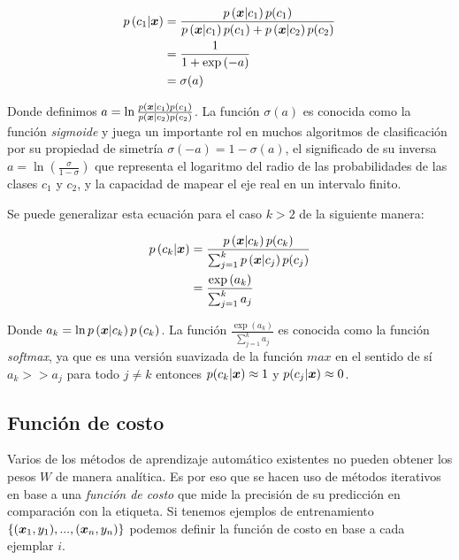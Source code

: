 \begin{align}
    p\left( c_1 | \boldsymbol{x} \right) &= \frac{p\left( \boldsymbol{x} | c_1 \right)p(c_1)}{
                                            p\left( \boldsymbol{x} | c_1 \right) p(c_1) + 
                                            p\left( \boldsymbol{x} | c_2 \right)p(c_2)} \\
                                   &= \frac{1}{1 + \exp\left( -a \right)} \\
                                   &= \sigma(a)
\end{align}

Donde definimos $a = \ln \frac{p\left( \boldsymbol{x} | c_1 \right) p\left( c_1
\right)}{p\left( \boldsymbol{x} | c_2 \right) p\left( c_2 \right)}$. La función
$\sigma(a)$ es conocida como la función \emph{sigmoide} y juega un importante
rol en muchos algoritmos de clasificación por su propiedad de simetría
$\sigma(-a) = 1 - \sigma(a)$, el significado de su inversa $a = \ln \left(
\frac{\sigma}{1 - \sigma} \right)$ que representa el logaritmo del radio de las
probabilidades de las clases $c_1$ y $c_2$, y la capacidad de mapear el eje real
en un intervalo finito.

Se puede generalizar esta ecuación para el caso $k > 2$ de la siguiente manera:

\begin{align}
    p\left( c_k | \boldsymbol{x} \right) &= \frac{p\left( \boldsymbol{x} | c_k \right)p(c_k)}{
                                                \sum_{j=1}^{k} p\left( \boldsymbol{x} |
                                                c_j \right) p(c_j) } \\
                                       &= \frac{\exp\left( a_k \right)}{\sum_{j=1}^{k} a_j} \\
\end{align}

Donde $a_k = \ln p\left( \boldsymbol{x} | c_k \right) p\left( c_k \right)$. La función
$\frac{\exp\left( a_k \right)}{\sum_{j=1}^{k} a_j}$ es conocida como la función
\emph{softmax}, ya que es una versión suavizada de la función $max$ en el sentido
de sí $a_k >> a_j$ para todo $j \neq k$ entonces $p(c_k | \boldsymbol{x}) \approx 1$ y
$p(c_j | \boldsymbol{x}) \approx 0$.

\subsection{Función de costo}

Varios de los métodos de aprendizaje automático existentes no pueden obtener los pesos
$W$ de manera analítica. Es por eso que se hacen uso de métodos iterativos en
base a una \emph{función de costo} que mide la precisión de su predicción en
comparación con la etiqueta. Si tenemos ejemplos de entrenamiento
$\{(\boldsymbol{x}_{1}, y_{1}), ..., (\boldsymbol{x}_{n}, y_{n})\}$ podemos definir la
función de costo en base a cada ejemplar $i$.


